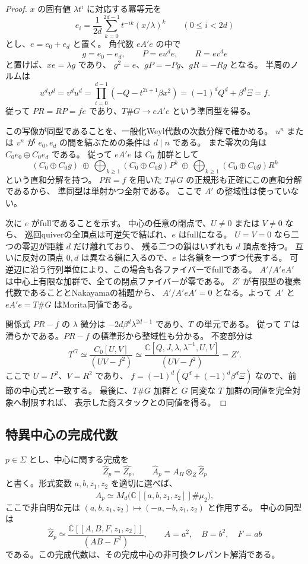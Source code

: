 \begin{proof}
$x$ の固有値 $\lambda t^i$ に対応する冪等元を
\[
 e_i=\frac1{2d}\sum_{k=0}^{2d-1}t^{-ik}(x/\lambda)^k
 \qquad(0\le i<2d)
\]
とし、$e=e_0+e_d$ と置く。
角代数 $eA'e$ の中で
\[
 g=e_0-e_d,\qquad P=e u^d e,\qquad R=e v^d e
\]
と置けば、$xe=\lambda g$ であり、
$g^2=e$、$gP=-Pg$、$gR=-Rg$ となる。
半周のノルムは
\[
 u^dv^d=v^du^d
 =\prod_{i=0}^{d-1}(-Q-t^{2i+1}\beta x^2)
 =(-1)^dQ^d+\beta^d\Xi=f.
\]
従って $PR=RP=fe$ であり、$T\#G\to eA'e$ という準同型を得る。

この写像が同型であることを、一般化Weyl代数の次数分解で確かめる。
$u^n$ または $v^n$ が $e_0,e_d$ の間を結ぶための条件は $d\mid n$ である。
また零次の角は $C_0e_0\oplus C_0e_d$ である。
従って $eA'e$ は $C_0$ 加群として
\[
 (C_0\oplus C_0g)
 \ \oplus\,\bigoplus_{k\ge1}(C_0\oplus C_0g)P^k
 \ \oplus\,\bigoplus_{k\ge1}(C_0\oplus C_0g)R^k
\]
という直和分解を持つ。
$PR=f$ を用いた $T\#G$ の正規形も正確にこの直和分解であるから、
準同型は単射かつ全射である。
ここで $A'$ の整域性は使っていない。

次に $e$ がfullであることを示す。
中心の任意の閉点で、$U\ne0$ または $V\ne0$ なら、
巡回quiverの全頂点は可逆矢で結ばれ、$e$ はfullになる。
$U=V=0$ なら二つの零辺が距離 $d$ だけ離れており、
残る二つの鎖はいずれも $d$ 頂点を持つ。
互いに反対の頂点 $0,d$ は異なる鎖に入るので、$e$ は各鎖を一つずつ代表する。
可逆辺に沿う行列単位により、この場合も各ファイバーでfullである。
$A'/A'eA'$ は中心上有限な加群で、全ての閉点ファイバーが零である。
$Z'$ が有限型の複素代数であることとNakayamaの補題から、
$A'/A'eA'=0$ となる。よって $A'$ と $eA'e=T\#G$ はMorita同値である。

関係式 $PR-f$ の $\lambda$ 微分は
$-2d\beta^d\lambda^{2d-1}$ であり、$T$ の単元である。
従って $T$ は滑らかである。$PR-f$ の標準形から整域性も分かる。
不変部分は
\[
 T^G\simeq\frac{C_0[U,V]}{(UV-f^2)}
 \simeq
 \frac{\mathbb C[Q,J,\lambda,\lambda^{-1},U,V]}{(UV-f^2)}=Z'.
\]
ここで $U=P^2$、$V=R^2$ であり、
$f=(-1)^d(Q^d+(-1)^d\beta^d\Xi)$ なので、前節の中心式と一致する。
最後に、$T\#G$ 加群と $G$ 同変な $T$ 加群の同値を完全対象へ制限すれば、
表示した商スタックとの同値を得る。
\end{proof}

\subsection{特異中心の完成代数}

\begin{corollary}[全ての偶数位数に共通する形式模型]
\label{cor:root-formal-McKay-v38}
$p\in\Sigma$ とし、中心に関する完成を
\[
 \widehat Z_p=\widehat{Z_p},\qquad
 \widehat A_p=A_H\otimes_Z\widehat Z_p
\]
と書く。形式変数 $a,b,z_1,z_2$ を適切に選べば、
\begin{equation}
\label{eq:root-formal-McKay-v38}
 \widehat A_p\simeq
 M_d\bigl(\mathbb C[[a,b,z_1,z_2]]\#\mu_2\bigr),
\end{equation}
ここで非自明な元は $(a,b,z_1,z_2)\mapsto(-a,-b,z_1,z_2)$ と作用する。
中心の同型は
\[
 \widehat Z_p\simeq
 \frac{\mathbb C[[A,B,F,z_1,z_2]]}{(AB-F^2)},
 \qquad A=a^2,\quad B=b^2,\quad F=ab
\]
である。この完成代数は、その完成中心の非可換クレパント解消である。
\end{corollary}

